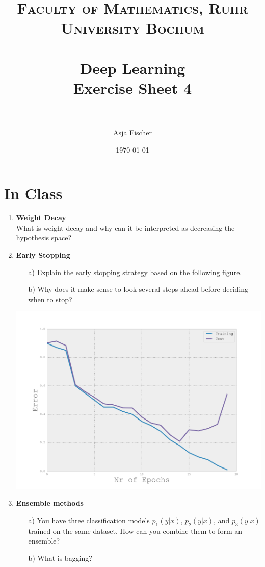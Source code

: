 \documentclass[paper=a4, fontsize=11pt]{scrartcl} %
\title{	
\normalfont \normalsize 
\textsc{Faculty of Mathematics, Ruhr University Bochum} \\ [25pt] %
\horrule{0.5pt} \\[0.4cm] %
\huge Deep Learning\\{\Large Exercise Sheet 4}\\ %
\horrule{2pt} \\[0.5cm] %
}
\author{Asja Fischer} %
\date{\normalsize\today} %
\numberwithin{equation}{section} %
\numberwithin{figure}{section} %
\numberwithin{table}{section} %
\begin{document}
\maketitle %
\section{In Class}
\begin{enumerate} 

\item \textbf{Weight Decay}\\
What is weight decay and why can it be interpreted as decreasing the hypothesis space?  

\item \textbf{Early Stopping}
\begin{itemize}
\item[a)] Explain the early stopping strategy based on the following figure.
\item[b)] Why does it make sense to look several steps ahead before deciding when to stop?
\end{itemize} 

\begin{center}
\includegraphics[width=.33\textwidth]{images/model1.png}
\end{center}

\item \textbf{Ensemble methods}
\begin{itemize}
\item[a)] You have three classification models $p_1(y|x)$, $p_2(y|x)$, and $p_3(y|x)$ trained on the same dataset. How can you combine them to form an ensemble?  
\item[b)] What is bagging? 
\end{itemize}


\end{enumerate}
\end{document}
